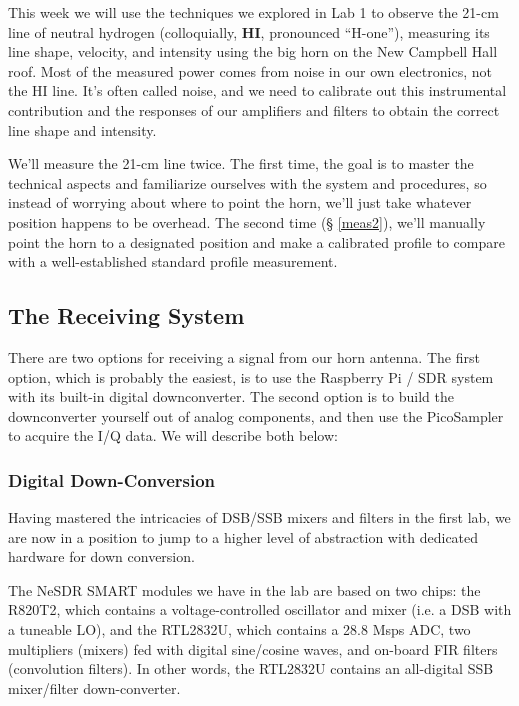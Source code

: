 \documentclass[11pt,preprint]{aastex}
\begin{document}
\noindent
This week we will use the techniques we explored in Lab 1 to observe the
21-cm line of neutral hydrogen (colloquially, {\bf
  HI}, pronounced ``H-one''), measuring its line
shape, velocity, and intensity using the big horn on the New Campbell Hall roof.
Most of the measured power comes from noise in our own electronics, not the HI
line.  It's often called noise, and we need to calibrate out this
instrumental contribution and the responses of our amplifiers and filters to
obtain the correct line shape and intensity.

We'll measure the 21-cm line twice. The first time, the goal is to master
the technical aspects and familiarize ourselves with the system and
procedures, so instead of worrying about where to point the horn, we'll
just take whatever position happens to be overhead. The second time (\S
\ref{meas2}), we'll manually point the horn to a designated position and
make a calibrated profile to compare with a well-established standard
profile measurement.

\subsection{The Receiving System}

\noindent
There are two options for receiving a signal from our horn antenna. The
first option, which is probably the easiest, is to use the 
Raspberry Pi / SDR system with its built-in digital downconverter. The
second option is to build the downconverter yourself out of analog
components, and then use the PicoSampler to acquire the I/Q data. We
will describe both below:

\subsubsection{Digital Down-Conversion}

\noindent
Having mastered the intricacies of DSB/SSB mixers and filters in the
first lab, we are now in a position to jump to a higher level of 
abstraction with dedicated hardware for down conversion.

The NeSDR SMART modules we have in the lab are based on two chips:
the R820T2, which contains a voltage-controlled oscillator and mixer
(i.e. a DSB with a tuneable LO), and the RTL2832U, which contains
a 28.8 Msps ADC, two multipliers (mixers) fed with digital sine/cosine
waves, and on-board FIR filters (convolution filters). 
In other words, the RTL2832U contains an all-digital SSB mixer/filter
down-converter.
\end{document}
